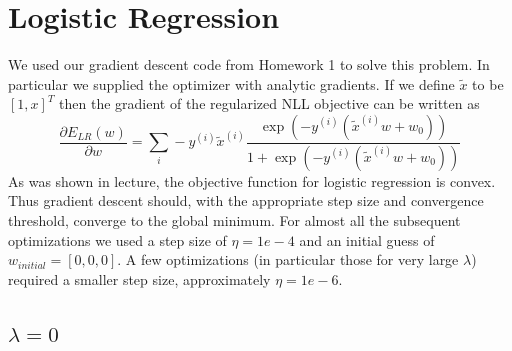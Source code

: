 \documentclass[10pt]{article}
\begin{document}
 



\section{Logistic Regression}



We used our gradient descent code from Homework 1 to solve this problem. In particular we supplied the optimizer with analytic gradients. If we define $\tilde{x}$ to be $[1,x]^T$ then the gradient of the regularized NLL objective can be written as
%
%
\begin{equation}
\frac{\partial E_{LR}(w)}{\partial w} = \sum_i -y^{(i)} \tilde{x}^{(i)} \frac{\exp(-y^{(i)}(\tilde{x}^{(i)}w + w_0))}{1 + \exp(-y^{(i)}(\tilde{x}^{(i)}w + w_0))}
\end{equation}
%
%
As was shown in lecture, the objective function for logistic regression is convex. Thus gradient descent should, with the appropriate step size and convergence threshold, converge to the global minimum. For almost all the subsequent optimizations we used a step size of $\eta = 1e-4$ and an initial guess of $w_{initial} = [0,0,0]$. A few optimizations (in particular those for very large $\lambda$) required a smaller step size, approximately $\eta = 1e-6$.

\subsection{$\lambda = 0$}
\end{document}
